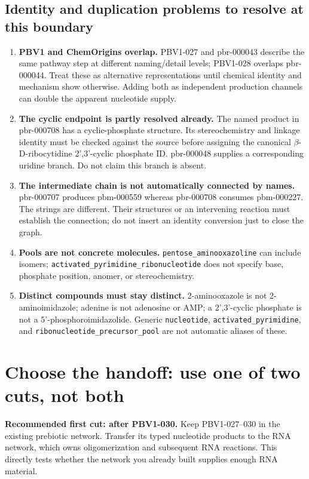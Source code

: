 \documentclass[11pt]{article}
\begin{document}
\subsection{Identity and duplication problems to resolve at this boundary}
\begin{enumerate}
\item \textbf{PBV1 and ChemOrigins overlap.} PBV1-027 and pbr-000043 describe the
same pathway step at different naming/detail levels; PBV1-028 overlaps
pbr-000044. Treat these as alternative representations until chemical identity
and mechanism show otherwise. Adding both as independent production channels
can double the apparent nucleotide supply.
\item \textbf{The cyclic endpoint is partly resolved already.} The named product
in pbr-000708 has a cyclic-phosphate structure. Its stereochemistry and linkage
identity must be checked against the source before assigning the canonical
$\beta$-D-ribocytidine 2',3'-cyclic phosphate ID. pbr-000048 supplies a corresponding
uridine branch. Do not claim this branch is absent.
\item \textbf{The intermediate chain is not automatically connected by names.}
pbr-000707 produces pbm-000559 whereas pbr-000708 consumes pbm-000227. The strings
are different. Their structures or an intervening reaction must establish the
connection; do not insert an identity conversion just to close the graph.
\item \textbf{Pools are not concrete molecules.} \texttt{pentose\_aminooxazoline}
can include isomers; \texttt{activated\_pyrimidine\_ribonucleotide} does not specify
base, phosphate position, anomer, or stereochemistry.
\item \textbf{Distinct compounds must stay distinct.} 2-aminooxazole is not
2-aminoimidazole; adenine is not adenosine or AMP; a 2',3'-cyclic phosphate is not
a 5'-phosphoroimidazolide. Generic \texttt{nucleotide}, \texttt{activated\_pyrimidine},
and \texttt{ribonucleotide\_precursor\_pool} are not automatic aliases of these.
\end{enumerate}

\section{Choose the handoff: use one of two cuts, not both}
\textbf{Recommended first cut: after PBV1-030.} Keep PBV1-027--030 in the existing
prebiotic network. Transfer its typed nucleotide products to the RNA network,
which owns oligomerization and subsequent RNA reactions. This directly tests
whether the network you already built supplies enough RNA material.
\end{document}
